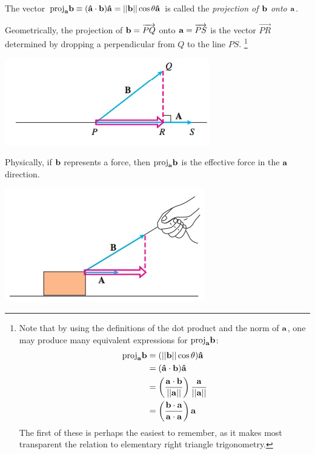 \documentclass[12pt,letterpaper,reqno]{article}
\numberwithin{equation}{section}
\newcommand{\ti}[1]{\textit{#1}}
\begin{document}
\begin{defn}
	The vector $\text{proj}_{\bf a}{\bf b}\equiv ({\bf \hat{a}}\cdot {\bf b}){\bf \hat{a}}=||{\bf b}||\cos \theta {\bf \hat{a}}$ is called the \ti{projection of ${\bf b}$ onto ${\bf a}$}.
\end{defn}
Geometrically, the projection of ${\bf b}=\overrightarrow{PQ}$ onto ${\bf a}=\overrightarrow{PS}$ is the vector $\overrightarrow{PR}$ determined by dropping a perpendicular from $Q$ to the line $PS$. \footnote{Note that by using the definitions of the dot product and the norm of ${\bf a}$, one may produce many equivalent expressions for $\text{proj}_{\bf a}{\bf b}$:
\begin{align*}
	\text{proj}_{\bf a}{\bf b}&=(||{\bf b}||\cos \theta){\bf \hat{a}} \\
	&=({\bf \hat{a}}\cdot {\bf b}){\bf \hat{a}} \\
	&=\left(\frac{{\bf a}\cdot {\bf b}}{||{\bf a}||}\right)\frac{{\bf a}}{||{\bf a}||} \\
	&=\left(\frac{{\bf b}\cdot {\bf a}}{{\bf a}\cdot {\bf a}}\right){\bf a}
\end{align*}
The first of these is perhaps the easiest to remember, as it makes most transparent the relation to elementary right triangle trigonometry.}

\begin{center}
	\includegraphics[scale=0.5]{figures_mvc/vector_projection_def}
\end{center}
Physically, if ${\bf b}$ represents a force, then $\text{proj}_{\bf a}{\bf b}$ is the effective force in the ${\bf a}$ direction.

\begin{center}
	\includegraphics[scale=0.5]{figures_mvc/effective_force_box}
\end{center}	
\end{document}
